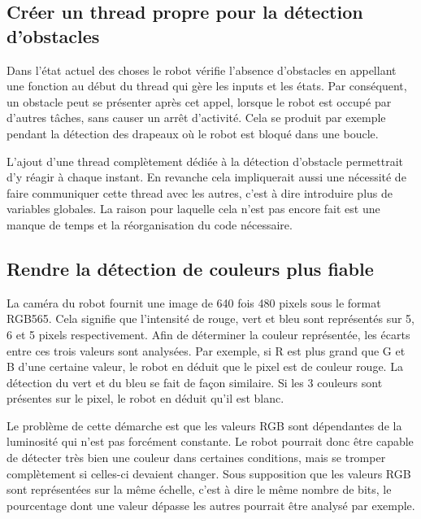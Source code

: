 \documentclass{article}
\begin{document}
    \subsection{Créer un thread propre pour la détection d'obstacles}
    Dans l'état actuel des choses le robot vérifie l'absence d'obstacles en appellant une fonction au début du thread qui gère les inputs et les états.
    Par conséquent, un obstacle peut se présenter après cet appel, lorsque le robot est occupé par d'autres tâches, sans causer un arrêt d'activité.
    Cela se produit par exemple pendant la détection des drapeaux où le robot est bloqué dans une boucle.

    L'ajout d'une thread complètement dédiée à la détection d'obstacle permettrait d'y réagir à chaque instant.
    En revanche cela impliquerait aussi une nécessité de faire communiquer cette thread avec les autres, c'est à dire introduire plus de variables globales.
    La raison pour laquelle cela n'est pas encore fait est une manque de temps et la réorganisation du code nécessaire.

    \subsection{Rendre la détection de couleurs plus fiable}
    La caméra du robot fournit une image de 640 fois 480 pixels sous le format RGB565.
    Cela signifie que l'intensité de rouge, vert et bleu sont représentés sur 5, 6 et 5 pixels respectivement.
    Afin de déterminer la couleur représentée, les écarts entre ces trois valeurs sont analysées.
    Par exemple, si R est plus grand que G et B d'une certaine valeur, le robot en déduit que le pixel est de couleur rouge.
    La détection du vert et du bleu se fait de façon similaire.
    Si les 3 couleurs sont présentes sur le pixel, le robot en déduit qu'il est blanc.
    
    Le problème de cette démarche est que les valeurs RGB sont dépendantes de la luminosité qui n'est pas forcément constante.
    Le robot pourrait donc être capable de détecter très bien une couleur dans certaines conditions, mais se tromper complètement si celles-ci devaient changer.
    Sous supposition que les valeurs RGB sont représentées sur la même échelle, c'est à dire le même nombre de bits, le pourcentage dont une valeur dépasse les autres pourrait être analysé par exemple. 
    
\end{document}
